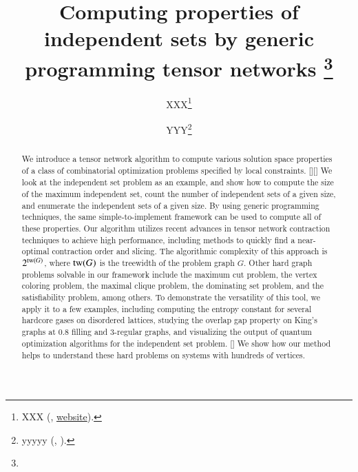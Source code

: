 \documentclass[onefignum, onetabnum]{siamart190516}
\title{Computing properties of independent sets by generic programming tensor networks
\thanks{\funding{...}}
}
\author{XXX\thanks{XXX 
  (\email{email}, \url{website}).}
\and YYY\thanks{yyyyy 
  (\email{yyyy}, \email{email}).}
}
\newcommand{\<}{\langle}
\renewcommand{\>}{\rangle}
\newcommand{\blue}[1]{[{\bf  \color{blue}{JG: #1}}]}
\newcommand{\purple}[1]{[{\bf  \color{purple}{MC: #1}}]}
\newcounter{example}
\begin{document}
\maketitle

\begin{abstract}
We introduce a tensor network algorithm %
to compute various solution space properties of a class of combinatorial optimization problems specified by local constraints. \purple{I still think there is a more concise way to word the class of combinatorial optimization problems this works on...}\blue{changed a bit, better?}
We look at the independent set problem as an example, and show how to compute the size of the maximum independent set, count the number of independent sets of a given size, and enumerate the independent sets of a given size.
By using generic programming techniques, %
the same simple-to-implement framework can be used to compute all of these properties. Our algorithm utilizes recent advances in tensor network contraction techniques to achieve high performance, including methods to quickly find a near-optimal contraction order and slicing.
The algorithmic complexity of this approach is $2^{{\rm tw}(G)}$, where ${\rm tw} (G)$ is the treewidth of the problem graph $G$.
Other hard graph problems solvable in our framework include the maximum cut problem, the vertex coloring problem, the maximal clique problem, the dominating set problem, and the satisfiability problem, among others.
To demonstrate the versatility of this tool, we apply it to a few examples, including computing the entropy constant for several hardcore gases on disordered lattices, studying the overlap gap property on King's graphs at $0.8$ filling and 3-regular graphs, and visualizing the output of quantum optimization algorithms for the independent set problem. \purple{I might not directly mention the classes of graphs we look at for overlap gap - it might be too much information. I'm not sure though, what do you think?} %
We show how our method helps to understand these hard problems on systems with hundreds of vertices.
\end{abstract}
\end{document}
